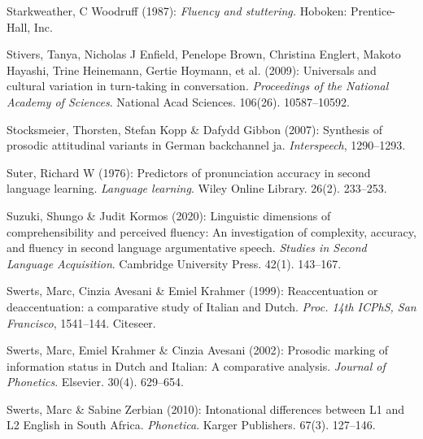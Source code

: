 \begin{styleBibliography}
Starkweather, C Woodruff (1987): \textit{Fluency and stuttering.} Hoboken: Prentice-Hall, Inc.
\end{styleBibliography}

\begin{styleBibliography}
Stivers, Tanya, Nicholas J Enfield, Penelope Brown, Christina Englert, Makoto Hayashi, Trine Heinemann, Gertie Hoymann, et al. (2009): Universals and cultural variation in turn-taking in conversation. \textit{Proceedings of the National Academy of Sciences}. National Acad Sciences. 106(26). 10587–10592.
\end{styleBibliography}

\begin{styleBibliography}
Stocksmeier, Thorsten, Stefan Kopp \& Dafydd Gibbon (2007): Synthesis of prosodic attitudinal variants in German backchannel ja. \textit{Interspeech}, 1290–1293.
\end{styleBibliography}

\begin{styleBibliography}
Suter, Richard W (1976): Predictors of pronunciation accuracy in second language learning. \textit{Language learning}. Wiley Online Library. 26(2). 233–253.
\end{styleBibliography}

\begin{styleBibliography}
Suzuki, Shungo \& Judit Kormos (2020): Linguistic dimensions of comprehensibility and perceived fluency: An investigation of complexity, accuracy, and fluency in second language argumentative speech. \textit{Studies in Second Language Acquisition}. Cambridge University Press. 42(1). 143–167.
\end{styleBibliography}

\begin{styleBibliography}
Swerts, Marc, Cinzia Avesani \& Emiel Krahmer (1999): Reaccentuation or deaccentuation: a comparative study of Italian and Dutch. \textit{Proc. 14th ICPhS, San Francisco}, 1541–144. Citeseer.
\end{styleBibliography}

\begin{styleBibliography}
Swerts, Marc, Emiel Krahmer \& Cinzia Avesani (2002): Prosodic marking of information status in Dutch and Italian: A comparative analysis. \textit{Journal of Phonetics}. Elsevier. 30(4). 629–654.
\end{styleBibliography}

\begin{styleBibliography}
Swerts, Marc \& Sabine Zerbian (2010): Intonational differences between L1 and L2 English in South Africa. \textit{Phonetica}. Karger Publishers. 67(3). 127–146.
\end{styleBibliography}

